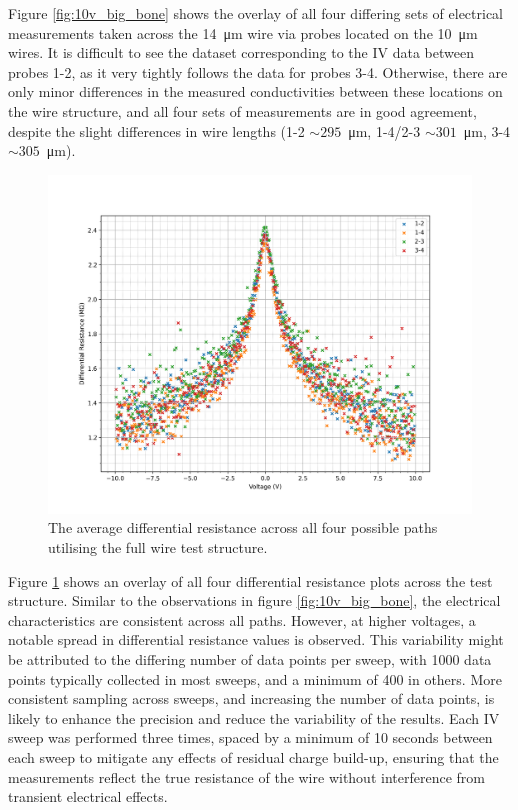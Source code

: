 \begin{refsection}
Figure \ref{fig:10v_big_bone} shows the overlay of all four differing sets of electrical measurements taken across the 14~\si{\micro\metre} wire via probes located on the 10~\si{\micro\metre} wires. It is difficult to see the dataset corresponding to the IV data between probes 1-2, as it very tightly follows the data for probes 3-4. Otherwise, there are only minor differences in the measured conductivities between these locations on the wire structure, and all four sets of measurements are in good agreement, despite the slight differences in wire lengths (1-2 $\sim295$~\si{\micro\metre}, 1-4/2-3 $\sim301$~\si{\micro\metre}, 3-4 $\sim305$~\si{\micro\metre}).

\begin{figure}[H]
    \centering
    \includegraphics[width=\linewidth]{Chapter7/Figs/Raster/cross dr.png}
    \caption{The average differential resistance across all four possible paths utilising the full wire test structure.}
    \label{fig:10v_big_bone_dr}
\end{figure}

Figure \ref{fig:10v_big_bone_dr} shows an overlay of all four differential resistance plots across the test structure. Similar to the observations in figure \ref{fig:10v_big_bone}, the electrical characteristics are consistent across all paths. However, at higher voltages, a notable spread in differential resistance values is observed. This variability might be attributed to the differing number of data points per sweep, with 1000 data points typically collected in most sweeps, and a minimum of 400 in others. More consistent sampling across sweeps, and increasing the number of data points, is likely to enhance the precision and reduce the variability of the results. Each IV sweep was performed three times, spaced by a minimum of 10 seconds between each sweep to mitigate any effects of residual charge build-up, ensuring that the measurements reflect the true resistance of the wire without interference from transient electrical effects.


\end{refsection}
